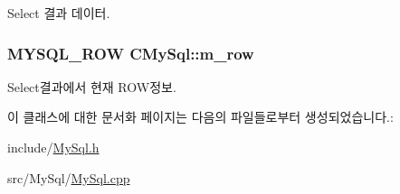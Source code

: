 Select 결과 데이터. \hypertarget{classCMySql_a9f0d22a3ca8f698ed70289452342f53e}{
\subsubsection[{m\_\-row}]{\setlength{\rightskip}{0pt plus 5cm}MYSQL\_\-ROW {\bf CMySql::m\_\-row}}}
\label{classCMySql_a9f0d22a3ca8f698ed70289452342f53e}


Select결과에서 현재 ROW정보. 

이 클래스에 대한 문서화 페이지는 다음의 파일들로부터 생성되었습니다.:\begin{DoxyCompactItemize}
\item 
include/\hyperlink{MySql_8h}{MySql.h}\item 
src/MySql/\hyperlink{MySql_8cpp}{MySql.cpp}\end{DoxyCompactItemize}
